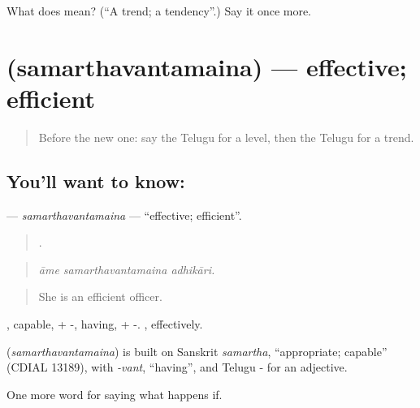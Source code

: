 \begin{tcolorbox}[breakable,colback=teal!4,colframe=teal!35!black,title={Before you move on}]
What does  mean? (\textquotedblleft{}A trend; a tendency\textquotedblright{}.) Say it once more.
\end{tcolorbox}
\section[\texorpdfstring{\te{సమర్థవంతమైన} (samarthavantamaina)}{సమర్థవంతమైన (samarthavantamaina)}]{ (samarthavantamaina) — effective; efficient}

\label{lesson:TE-C431-samarthavantamaina}



\begin{quote}
Before the new one: say the Telugu for a level, then the Telugu for a trend.
\end{quote}

\subsection*{You'll want to know: }
\textbf{} — \emph{samarthavantamaina} — \textquotedblleft{}effective; efficient\textquotedblright{}.

\begin{quote}
  .
\end{quote}

\begin{quote}
\emph{āme samarthavantamaina adhikāri.}
\end{quote}

\begin{quote}
She is an efficient officer.
\end{quote}

, capable, + -, having, + -. , effectively.

\begin{cousinweb}
\textbf{} (\emph{samarthavantamaina}) is built on Sanskrit \emph{samartha}, \textquotedblleft{}appropriate; capable\textquotedblright{} (CDIAL 13189), with \emph{-vant}, \textquotedblleft{}having\textquotedblright{}, and Telugu - for an adjective.
\end{cousinweb}

\begin{grammarlens}[title={What you've built}]
One more word for saying what happens if.
\end{grammarlens}

